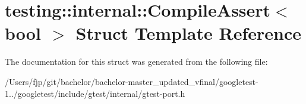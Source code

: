 \hypertarget{structtesting_1_1internal_1_1_compile_assert}{}\section{testing\+:\+:internal\+:\+:Compile\+Assert$<$ bool $>$ Struct Template Reference}
\label{structtesting_1_1internal_1_1_compile_assert}


The documentation for this struct was generated from the following file\+:\begin{DoxyCompactItemize}
\item 
/\+Users/fjp/git/bachelor/bachelor-\/master\+\_\+updated\+\_\+vfinal/googletest-\/1../googletest/include/gtest/internal/gtest-\/port.\+h\end{DoxyCompactItemize}
